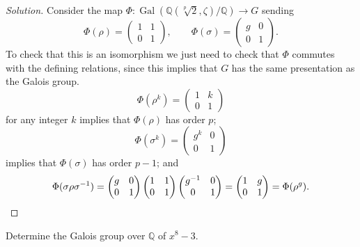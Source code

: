 \documentclass[10pt]{article}
\providecommand{\Gal}{\operatorname{Gal}}
\providecommand{\QQ}{\mathbb Q}
\providecommand{\inv}{^{-1}}
\newenvironment{soln}{\begin{proof}[Solution]}{\end{proof}}
\begin{document}
\begin{soln}
    Consider the map $\Phi\colon\Gal(\QQ(\sqrt[p]2,\zeta)/\QQ)\to G$ sending
    \begin{equation*}
        \Phi(\rho) = \begin{pmatrix}
	    1&1\\0&1
        \end{pmatrix},\qquad
	\Phi(\sigma) = \begin{pmatrix}
	    g&0\\0&1
	\end{pmatrix}.
    \end{equation*}
    To check that this is an isomorphism
    we just need to check that $\Phi$ commutes with
    the defining relations, since this implies that
    $G$ has the same presentation as the Galois group.
    \begin{equation*}
        \Phi(\rho^k) = \begin{pmatrix}
	    1&k\\0&1
        \end{pmatrix}
    \end{equation*}
    for any integer $k$ implies that $\Phi(\rho)$ has order $p$;
    \begin{equation*}
        \Phi(\sigma^k) = \begin{pmatrix}
	    g^k & 0\\0 & 1
        \end{pmatrix}
    \end{equation*}
    implies that $\Phi(\sigma)$ has order $p-1$; and
    \begin{equation*}
        \Phi(\sigma\rho\sigma\inv)
	= \begin{pmatrix}
	    g&0\\0&1
	\end{pmatrix}
	\begin{pmatrix}
	    1&1\\0&1
	\end{pmatrix}
	\begin{pmatrix}
	    g\inv&0\\0&1
	\end{pmatrix}
	= \begin{pmatrix}
	    1&g\\0&1
	\end{pmatrix} = \Phi(\rho^g).\qedhere
    \end{equation*}
\end{soln}

\pagebreak
\begin{problem}
    [\S14.2\#10]
    Determine the Galois group over $\QQ$ of $x^8 - 3$.
\end{problem}
\end{document}

